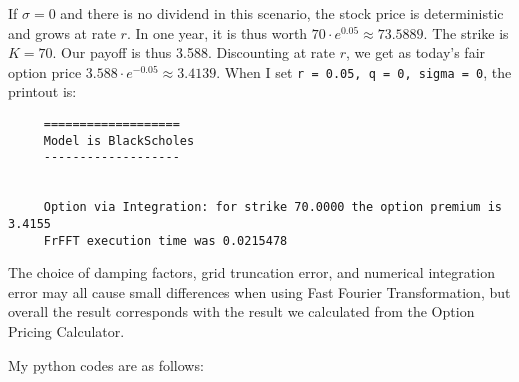 \documentclass[letterpaper]{article}
\begin{document}
	 If $\sigma=0$ and there is no dividend in this scenario, the stock price is deterministic and grows at rate $r$. In one year, it is thus worth $70 \cdot e^{0.05} \approx 73.5889$. The strike is $K=70$. Our payoff is thus 3.588. Discounting at rate $r$, we get as today's fair option price $3.588 \cdot e^{-0.05} \approx 3.4139$. When I set \texttt{r = 0.05, q = 0, sigma = 0}, the printout is:
	 
	 \begin{minipage}{\linewidth}
	 	\begin{Verbatim}
     ===================
     Model is BlackScholes
     -------------------
     
     
     Option via Integration: for strike 70.0000 the option premium is 3.4155
     FrFFT execution time was 0.0215478
	 	\end{Verbatim}
	 \end{minipage}
 
    The choice of damping factors, grid truncation error, and numerical integration error may all cause small differences when using Fast Fourier Transformation, but overall the result corresponds with the result we calculated from the Option Pricing Calculator.
 
	 My python codes are as follows:
	 
\end{document}
